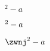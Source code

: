 \startTEXpage[offset=10pt]
    $     {}^2 - a $\par
    $ \relax^2 - a $\par
    $  \zwnj^2 - a $\par
\stopTEXpage
